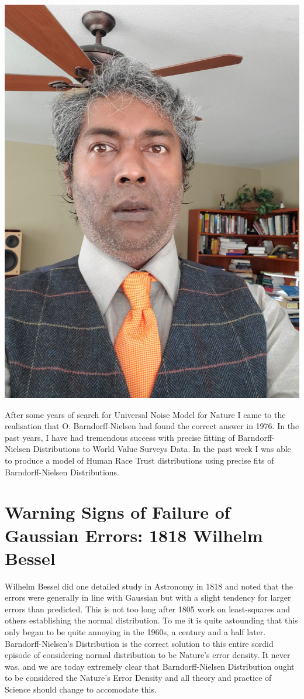 \documentclass{amsart}
\begin{document}
\includegraphics[angle=270,scale=0.16]{may19-2021.jpg}

After some years of search for Universal Noise Model for Nature I came to the realisation that O. Barndorff-Nielsen had found the correct answer in 1976.  In the past years, I have had tremendous success with precise fitting of Barndorff-Nielsen Distributions to World Value Surveys Data.  In the past week I was able to produce a model of Human Race Trust distributions using precise fits of Barndorff-Nielsen Distributions.


\section{Warning Signs of Failure of Gaussian Errors: 1818 Wilhelm Bessel}

Wilhelm Bessel did one detailed study in Astronomy in 1818 and noted that the errors were generally in line with Gaussian but with a slight tendency for larger errors than predicted.  This is not too long after 1805 work on least-squares and others establishing the normal distribution.  To me it is quite astounding that this only began to be quite annoying in the 1960s, a century and a half later.  Barndorff-Nielsen's Distribution is the correct solution to this entire sordid episode of considering normal distribution to be Nature's error density.  It never was, and we are today extremely clear that Barndorff-Nielsen Distribution ought to be considered the Nature's Error Density and all theory and practice of Science should change to accomodate this.
\end{document}
